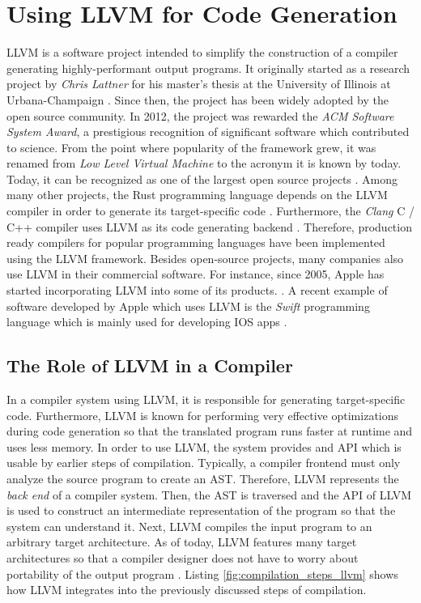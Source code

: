 \section{Using LLVM for Code Generation}

LLVM is a software project intended to simplify the construction of a compiler generating highly-performant output programs.
It originally started as a research project by \emph{Chris Lattner} for his master's thesis at the University of Illinois at Urbana-Champaign \cite{Lattner:MSThesis02}.
Since then, the project has been widely adopted by the open source community.
In 2012, the project was rewarded the \emph{ACM Software System Award}, a prestigious recognition of significant software which contributed to science.
From the point where popularity of the framework grew, it was renamed from \emph{Low Level Virtual Machine} to the acronym it is known by today.
Today, it can be recognized as one of the largest open source projects \cite[preface]{Cardoso_Lopes2014-jt}.
Among many other projects, the Rust programming language depends on the LLVM compiler in order to generate its target-specific code \cite[p.~373]{McNamara2021-hz}.
Furthermore, the \emph{Clang} C / C++ compiler uses LLVM as its code generating backend \cite[preface]{Hsu2021-ez}.
Therefore, production ready compilers for popular programming languages have been implemented using the LLVM framework.
Besides open-source projects, many companies also use LLVM in their commercial software.
For instance, since 2005, Apple has started incorporating LLVM into some of its products. \cite[pp.~11-15]{Fandrey}.
A recent example of software developed by Apple which uses LLVM is the \emph{Swift} programming language which is mainly used for developing IOS apps \cite[preface]{Hsu2021-ez}.

\subsection{The Role of LLVM in a Compiler}

In a compiler system using LLVM, it is responsible for generating target-specific code.
Furthermore, LLVM is known for performing very effective optimizations during code generation so that the translated program runs faster at runtime and uses less memory.
In order to use LLVM, the system provides and API which is usable by earlier steps of compilation.
Typically, a compiler frontend must only analyze the source program to create an AST.
Therefore, LLVM represents the \emph{back end} of a compiler system.
Then, the AST is traversed and the API of LLVM is used to construct an intermediate representation of the program so that the system can understand it.
Next, LLVM compiles the input program to an arbitrary target architecture.
As of today, LLVM features many target architectures so that a compiler designer does not have to worry about portability of the output program \cite[preface]{Hsu2021-ez}.
Listing \ref{fig:compilation_steps_llvm} shows how LLVM integrates into the previously discussed steps of compilation.

